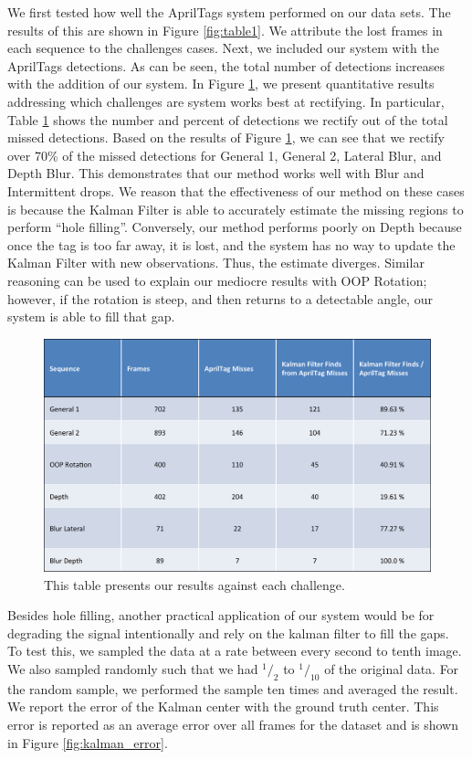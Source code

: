 \documentclass[letterpaper,10pt,conference]{IEEEtran}
\begin{document}
We first tested how well the AprilTags system performed on our data sets. The results of this are shown in Figure \ref{fig:table1}. We attribute the lost frames in each sequence to the challenges cases. Next, we included our system with the AprilTags detections. As can be seen, the total number of detections increases with the addition of our system. In Figure \ref{fig:table2}, we present quantitative results addressing which challenges are system works best at rectifying. In particular, Table \ref{fig:table2} shows the number and percent of detections we rectify out of the total missed detections. Based on the results of Figure \ref{fig:table2}, we can see that we rectify over 70\% of the missed detections for General 1, General 2, Lateral Blur, and Depth Blur. This demonstrates that our method works well with Blur and Intermittent drops. We reason that the effectiveness of our method on these cases is because the Kalman Filter is able to accurately estimate the missing regions to perform ``hole filling''. Conversely, our method performs poorly on Depth because once the tag is too far away, it is lost, and the system has no way to update the Kalman Filter with new observations. Thus, the estimate diverges. Similar reasoning can be used to explain our mediocre results with OOP Rotation; however, if the rotation is steep, and then returns to a detectable angle, our system is able to fill that gap.

\begin{figure}
\centering
\includegraphics[scale=.4]{table2}
\caption{This table presents our results against each challenge.}
\label{fig:table2}
\end{figure}

Besides hole filling, another practical application of our system would be for degrading the signal intentionally and rely on the kalman filter to fill the gaps. To test this, we sampled the data at a rate between every second to tenth image.  We also sampled randomly such that we had $^1/_2$ to $^1/_{10}$ of the original data.  For the random sample, we performed the sample ten times and averaged the result. We report the error of the Kalman center with the ground truth center.  This error is reported as an average error over all frames for the dataset and is shown in Figure \ref{fig:kalman_error}.
\end{document}

